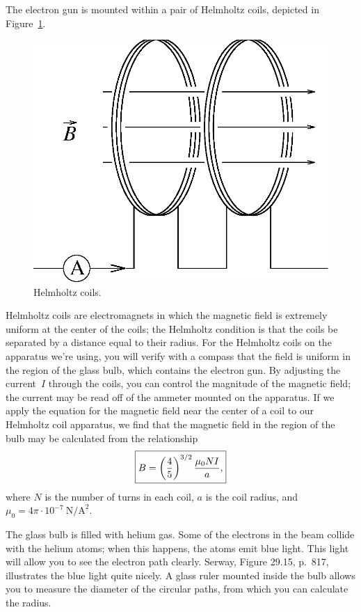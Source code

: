 The electron gun is mounted within a pair of Helmholtz coils, depicted in 
Figure~\ref{fig:ed:helmholtz}.
\begin{figure}[htb]
\centering \epsfxsize=6cm \includegraphics[scale=0.6]{3_electrondynamics/helmholtz.eps}
\caption{Helmholtz coils.}
\label{fig:ed:helmholtz}
\end{figure}
Helmholtz coils are electromagnets in which the magnetic field is extremely 
uniform at the center of the coils; the Helmholtz condition is that the coils 
be separated by a distance equal to their radius.  For the Helmholtz coils on 
the apparatus we're using, you will verify with a compass that the field is 
uniform in the region of the glass bulb, which contains the electron gun. By 
adjusting the current~$I$ through the coils, you can control the magnitude of 
the magnetic field;  the current may be read off of the ammeter mounted on the 
apparatus. If we apply the equation for the magnetic field near the center of 
a coil to our Helmholtz coil apparatus, we find that the magnetic field in the 
region of the bulb may be calculated from the relationship 
\begin{equation}
\fbox{$ \displaystyle B= \left( \frac{4}{5}\right)^{3/2} \frac{\mu_0 N I}{a},$}  
\label{eq:ed:helmB}
\end{equation}
where $N$ is the number of turns in each coil, $a$ is the coil radius, and 
$\mu_0=4\pi\cdot 10^{-7}~\mbox{N/A}^2$. 
 
The glass bulb is filled with helium gas. Some of the electrons in the beam 
collide with the helium atoms; when this happens, the atoms emit blue light.
This light will allow you to see the electron path clearly.  Serway, 
Figure 29.15, p.\ 817, illustrates the blue light quite nicely.  A glass ruler 
mounted inside the bulb allows you to measure the diameter of the 
circular paths, from which you can calculate the radius.

